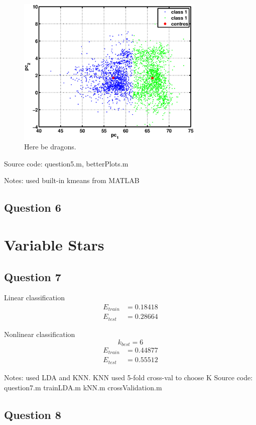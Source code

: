 \documentclass[a4paper, 11pt]{article}
\begin{document}
\begin{figure}[H]
    \centering
    \includegraphics[width=0.8\textwidth]{figures/question5_1}
    \caption{Here be dragons.}\label{fig:question5_1}
\end{figure}

Source code: question5.m, betterPlots.m

Notes: used built-in kmeans from MATLAB

\subsection*{Question 6}


\section{Variable Stars} %
\label{sec:variable_stars}

\subsection*{Question 7}

Linear classification
\begin{align*}
    E_{\mathit{train}} &= 0.18418 \\
    E_{\mathit{test}} &= 0.28664
\end{align*}

Nonlinear classification
\[
    k_{\mathit{best}} = 6
\]
\begin{align*}
    E_{\mathit{train}} &= 0.44877 \\
    E_{\mathit{test}} &= 0.55512
\end{align*}


Notes: used LDA and KNN\@. KNN used 5-fold cross-val to choose K
Source code: question7.m trainLDA.m kNN.m crossValidation.m

\subsection*{Question 8}

\end{document}
